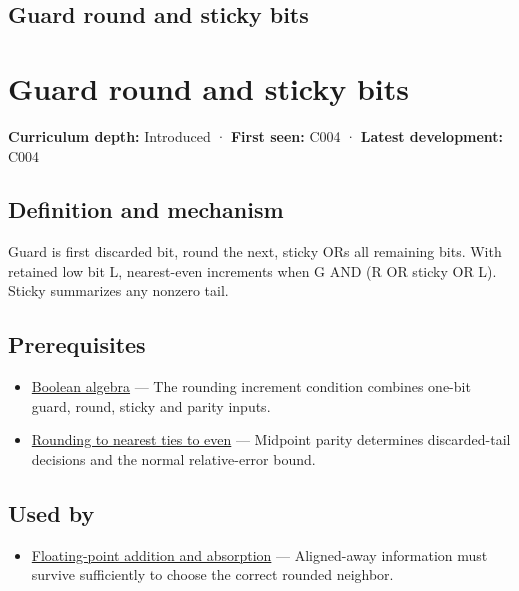 \hypertarget{appendix-b572b631069b}{}
\section*{Guard round and sticky bits}
\chapter{Guard round and sticky bits}\label{appendix-b572b631069b-guard-round-and-sticky-bits}

\textbf{Curriculum depth:} Introduced · \textbf{First seen:} C004 · \textbf{Latest development:} C004

\section{Definition and mechanism}\label{appendix-b572b631069b-definition-and-mechanism}

Guard is first discarded bit, round the next, sticky ORs all remaining bits. With retained low bit L, nearest-even increments when G AND (R OR sticky OR L). Sticky summarizes any nonzero tail.

\section{Prerequisites}\label{appendix-b572b631069b-prerequisites}

\begin{itemize}
\tightlist
\item
  \hyperref[appendix-24475e1596a8]{Boolean algebra} --- The rounding increment condition combines one-bit guard, round, sticky and parity inputs.
\item
  \hyperref[appendix-614afe1de592]{Rounding to nearest ties to even} --- Midpoint parity determines discarded-tail decisions and the normal relative-error bound.
\end{itemize}

\section{Used by}\label{appendix-b572b631069b-used-by}

\begin{itemize}
\tightlist
\item
  \hyperref[appendix-a1b1b4580dfd]{Floating-point addition and absorption} --- Aligned-away information must survive sufficiently to choose the correct rounded neighbor.
\end{itemize}

